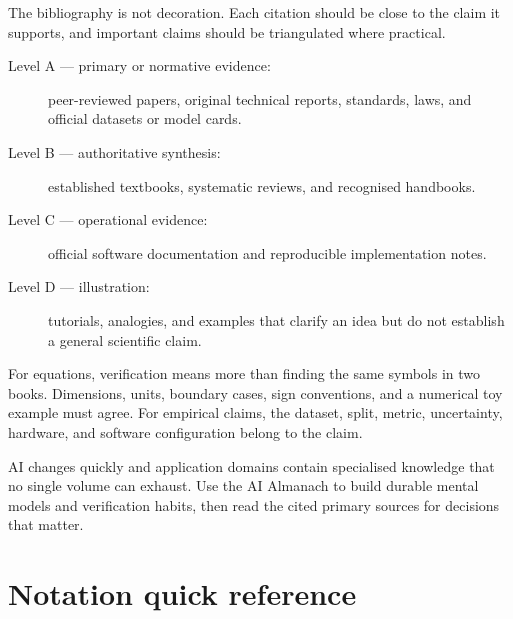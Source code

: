 The bibliography is not decoration.
Each citation should be close to the claim it supports, and important claims
should be triangulated where practical.

\begin{description}
    \item[Level A --- primary or normative evidence:]
        peer-reviewed papers, original technical reports, standards, laws,
        and official datasets or model cards.
    \item[Level B --- authoritative synthesis:]
        established textbooks, systematic reviews, and recognised handbooks.
    \item[Level C --- operational evidence:]
        official software documentation and reproducible implementation notes.
    \item[Level D --- illustration:]
        tutorials, analogies, and examples that clarify an idea but do not
        establish a general scientific claim.
\end{description}

For equations, verification means more than finding the same symbols in two
books.
Dimensions, units, boundary cases, sign conventions, and a numerical toy
example must agree.
For empirical claims, the dataset, split, metric, uncertainty, hardware, and
software configuration belong to the claim.

\begin{cautionbox}
AI changes quickly and application domains contain specialised knowledge that
no single volume can exhaust.
Use the AI Almanach to build durable mental models and verification habits, then
read the cited primary sources for decisions that matter.
\end{cautionbox}

\section*{Notation quick reference}

